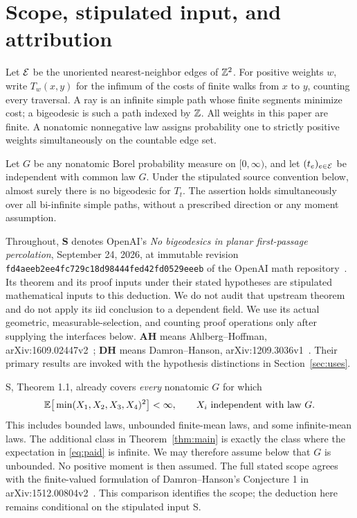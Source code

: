 \section{Scope, stipulated input, and attribution}\label{sec:intro}
Let $\mathcal E$ be the unoriented nearest-neighbor edges of $\mathbb Z^2$. For positive
weights $w$, write $T_w(x,y)$ for the infimum of the costs of finite walks
from $x$ to $y$, counting every traversal. A ray is an infinite simple path
whose finite segments minimize cost; a bigeodesic is such a path indexed by
$\mathbb Z$. All weights in this paper are finite. A nonatomic nonnegative law
assigns probability one to strictly positive weights simultaneously on
the countable edge set.

\begin{theorem}\label{thm:main}
Let $G$ be any nonatomic Borel probability measure on $[0,\infty)$, and let
$(t_e)_{e\in\mathcal E}$ be independent with common law $G$. Under the stipulated
source convention below, almost surely there is no bigeodesic for $T_t$.
The assertion holds simultaneously over all bi-infinite simple paths,
without a prescribed direction or any moment assumption.
\end{theorem}

Throughout, \textbf{S} denotes OpenAI's \emph{No bigeodesics in planar
first-passage percolation}, September 24, 2026, at immutable revision
\texttt{fd4aeeb2ee4fc729c18d98444fed42fd0529eeeb} of the OpenAI math
repository~\cite{S}. Its theorem and its proof inputs under their stated
hypotheses are stipulated mathematical inputs to this deduction. We do not
audit that upstream theorem and do not apply its iid conclusion to a
dependent field. We use its actual geometric, measurable-selection, and
counting proof operations only after supplying the interfaces below.
\textbf{AH} means Ahlberg--Hoffman, arXiv:1609.02447v2~\cite{AH};
\textbf{DH} means Damron--Hanson, arXiv:1209.3036v1~\cite{DH}.
Their primary results are invoked with the hypothesis distinctions in
Section~\ref{sec:uses}.

S, Theorem 1.1, already covers \emph{every} nonatomic $G$ for which
\begin{equation}\label{eq:paid}
 \mathbb E\big[\min(X_1,X_2,X_3,X_4)^2\big]<\infty,
 \qquad X_i\text{ independent with law }G.
\end{equation}
This includes bounded laws, unbounded finite-mean laws, and some
infinite-mean laws. The additional class in Theorem~\ref{thm:main} is exactly
the class where the expectation in \eqref{eq:paid} is infinite. We may
therefore assume below that $G$ is unbounded. No positive moment is then
assumed. The full stated scope agrees with the finite-valued formulation of
Damron--Hanson's Conjecture 1 in arXiv:1512.00804v2~\cite{DHb}.
This comparison identifies the scope; the deduction here remains conditional
on the stipulated input S.

